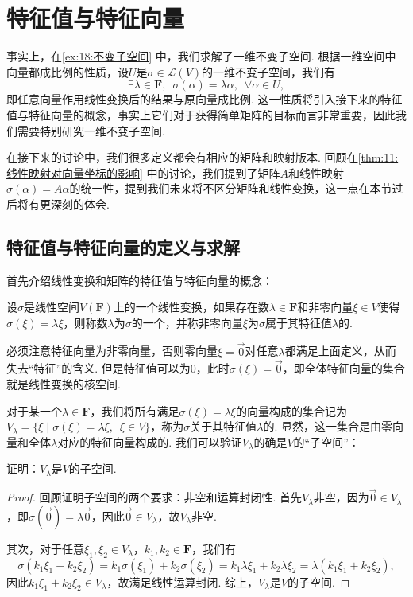 \section{特征值与特征向量}

事实上，在\autoref{ex:18:不变子空间} 中，我们求解了一维不变子空间. 根据一维空间中向量都成比例的性质，设$U$是$\sigma\in\mathcal{L}(V)$的一维不变子空间，我们有
\[\exists\lambda\in\mathbf{F},\enspace\sigma(\alpha)=\lambda\alpha,\enspace\forall \alpha\in U,\]
即任意向量作用线性变换后的结果与原向量成比例. 这一性质将引入接下来的特征值与特征向量的概念，事实上它们对于获得简单矩阵的目标而言非常重要，因此我们需要特别研究一维不变子空间.

在接下来的讨论中，我们很多定义都会有相应的矩阵和映射版本. 回顾在\autoref{thm:11:线性映射对向量坐标的影响} 中的讨论，我们提到了矩阵$A$和线性映射$\sigma(\alpha)=A\alpha$的统一性，提到我们未来将不区分矩阵和线性变换，这一点在本节过后将有更深刻的体会.

\subsection{特征值与特征向量的定义与求解}

首先介绍线性变换和矩阵的特征值与特征向量的概念：
\begin{definition}
    设$\sigma$是线性空间$V(\mathbf{F})$上的一个线性变换，如果存在数$\lambda\in\mathbf{F}$和非零向量$\xi\in V$使得$\sigma(\xi)=\lambda\xi$，则称数$\lambda$为$\sigma$的一个，并称非零向量$\xi$为$\sigma$属于其特征值$\lambda$的.
\end{definition}
必须注意特征向量为非零向量，否则零向量$\xi=\vec{0}$对任意$\lambda$都满足上面定义，从而失去``特征''的含义. 但是特征值可以为0，此时$\sigma(\xi)=\vec{0}$，即全体特征向量的集合就是线性变换的核空间.

对于某一个$\lambda\in\mathbf{F}$，我们将所有满足$\sigma(\xi)=\lambda\xi$的向量构成的集合记为$V_\lambda=\{\xi \mid \sigma(\xi)=\lambda\xi,\enspace\xi\in V\}$，称为$\sigma$关于其特征值$\lambda$的. 显然，这一集合是由零向量和全体$\lambda$对应的特征向量构成的. 我们可以验证$V_\lambda$的确是$V$的``子空间''：
\begin{example}
    证明：$V_\lambda$是$V$的子空间.
\end{example}

\begin{proof}
    回顾证明子空间的两个要求：非空和运算封闭性. 首先$V_\lambda$非空，因为$\vec{0}\in V_\lambda$，即$\sigma(\vec{0})=\lambda\vec{0}$，因此$\vec{0}\in V_\lambda$，故$V_\lambda$非空.

    其次，对于任意$\xi_1,\xi_2\in V_\lambda$，$k_1,k_2\in\mathbf{F}$，我们有
    \[\sigma(k_1\xi_1+k_2\xi_2)=k_1\sigma(\xi_1)+k_2\sigma(\xi_2)=k_1\lambda\xi_1+k_2\lambda\xi_2=\lambda(k_1\xi_1+k_2\xi_2),\]
    因此$k_1\xi_1+k_2\xi_2\in V_\lambda$，故满足线性运算封闭. 综上，$V_\lambda$是$V$的子空间.
\end{proof}

